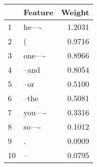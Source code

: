 \begin{tabular}{llr}
\toprule
{} &  Feature &  Weight \\
\midrule
1  &   he---- &  1.2031 \\
2  &        ( &  0.9716 \\
3  &  one---- &  0.8966 \\
4  &    --and &  0.8054 \\
5  &     --or &  0.5100 \\
6  &    --the &  0.5081 \\
7  &  you---- &  0.3316 \\
8  &   so---- &  0.1012 \\
9  &        . &  0.0909 \\
10 &       -- &  0.0795 \\
\bottomrule
\end{tabular}
